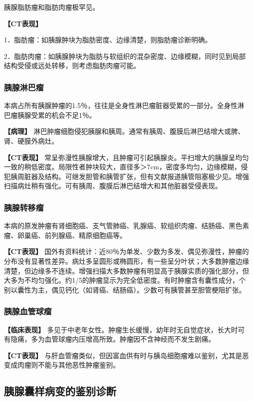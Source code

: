 胰腺脂肪瘤和脂肪肉瘤极罕见。

\textbf{【CT表现】}

1．脂肪瘤：如胰腺肿块为脂肪密度、边缘清楚，则脂肪瘤诊断明确。

2．脂肪肉瘤：如胰腺肿块为脂肪与软组织的混杂密度、边缘模糊，同时见到局部结构受侵或远处转移，则考虑脂肪肉瘤可能。

\subsubsection{胰腺淋巴瘤}

本病占所有胰腺肿瘤的1.5％，往往是全身性淋巴瘤脏器受累的一部分。全身性淋巴瘤胰腺受累的机会不足1％。

\textbf{【病理】}
淋巴肿瘤细胞侵犯胰腺和胰周。通常有胰周、腹膜后淋巴结增大或脾、肾、硬膜外病灶。

\textbf{【CT表现】}
常呈弥漫性胰腺增大，且肿瘤可引起胰腺炎。平扫增大的胰腺呈均匀一致的稍低密度。局限性者肿块较大，直径多＞7cm，密度多均匀，边缘模糊，侵犯胰周脏器及结构。可继发胆管和胰管扩张，但有文献报道胰管阻塞极少见。增强扫描病灶稍有强化。可有胰周、腹膜后淋巴结增大和其他脏器受侵表现。

\subsubsection{胰腺转移瘤}

本病的原发肿瘤有肾细胞癌、支气管肺癌、乳腺癌、软组织肉瘤、结肠癌、黑色素瘤、卵巢癌、前列腺癌、精原细胞癌等。

\textbf{【CT表现】}
国外有资料统计：近80％为单发、少数为多发、偶见弥漫性，肿瘤的分布没有显著性差异。病灶多呈圆形或椭圆形，有一些呈分叶状；大多数肿瘤边缘清楚，但边缘多不连续。增强扫描大多数肿瘤有明显高于胰腺实质的强化部分，但大多为不均匀强化。约1/5的肿瘤显示为完全低密度。有时肿瘤含有囊性成分，个别以囊性为主，偶见钙化（如肾癌、结肠癌）。少数可有胰管甚至胆管梗阻扩张。

\subsubsection{胰腺血管球瘤}

\textbf{【临床表现】}
多见于中老年女性。肿瘤生长缓慢，幼年时无自觉症状，长大时可有隐痛，多为血管球瘤内压增高所致。肿瘤因不含神经而不发生剧痛。

\textbf{【CT表现】}
与肝血管瘤类似，但因富血供有时与胰岛细胞瘤难以鉴别，尤其是恶变成肉瘤则不能与其他恶性肿瘤鉴别。

\subsection{胰腺囊样病变的鉴别诊断}

